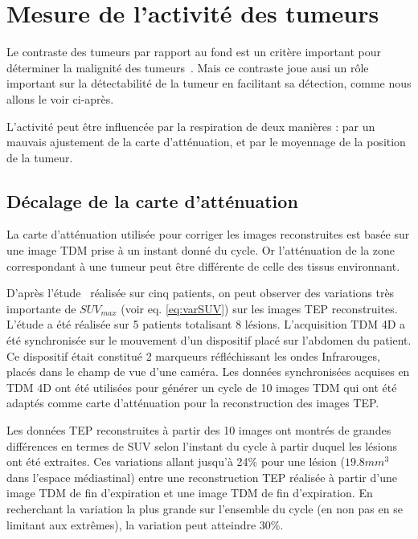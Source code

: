 \section{Mesure de l'activité des tumeurs}

Le contraste des tumeurs par rapport au fond est un critère important pour déterminer la malignité des tumeurs~\cite{dimitrakopoulou2002role, krak2005effects}. Mais ce contraste joue ausi un rôle important sur la détectabilité de la tumeur en facilitant sa détection, comme nous allons le voir ci-après.

L'activité peut être influencée par la respiration de deux manières : par un mauvais ajustement de la carte d'atténuation, et par le moyennage de la position de la tumeur.

\subsection{Décalage de la carte d'atténuation}

La carte d'atténuation utilisée pour corriger les images reconstruites est basée sur une image TDM prise à un instant donné du cycle. Or l'atténuation de la zone correspondant à une tumeur peut être différente de celle des tissus environnant.

D'après l'étude~\cite{erdi2004ct} réalisée sur cinq patients, on peut observer des variations très importante de $SUV_{max}$ (voir eq. \ref{eq:varSUV}) sur les images TEP reconstruites. L'étude a été réalisée sur 5 patients totalisant 8 lésions. L'acquisition TDM 4D a été synchronisée sur le mouvement d'un dispositif placé sur l'abdomen du patient. Ce dispositif était constitué 2 marqueurs réfléchissant les ondes Infrarouges, placés dans le champ de vue d'une caméra. Les données synchronisées acquises en TDM 4D ont été utilisées pour générer un cycle de 10 images TDM qui ont été adaptés comme carte d'atténuation pour la reconstruction des images TEP.

Les données TEP reconstruites à partir des 10 images ont montrés de grandes différences en termes de SUV selon l'instant du cycle à partir duquel les lésions ont été extraites.
Ces variations allant jusqu'à 24\% pour une lésion ($19.8 mm^3$ dans l'espace médiastinal) entre une reconstruction TEP réalisée à partir d'une image TDM de fin d'expiration et une image TDM de fin d'expiration. En recherchant la variation la plus grande sur l'ensemble du cycle (en non pas en se limitant aux extrêmes), la variation peut atteindre 30\%.


